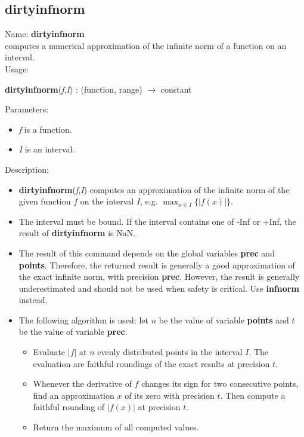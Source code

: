 \subsection{dirtyinfnorm}
\label{labdirtyinfnorm}
\noindent Name: \textbf{dirtyinfnorm}\\
computes a numerical approximation of the infinite norm of a function on an interval.\\

\noindent Usage: 
\begin{center}
\textbf{dirtyinfnorm}(\emph{f},\emph{I}) : (\textsf{function}, \textsf{range}) $\rightarrow$ \textsf{constant}\\
\end{center}
Parameters: 
\begin{itemize}
\item \emph{f} is a function.
\item \emph{I} is an interval.
\end{itemize}
\noindent Description: \begin{itemize}

\item \textbf{dirtyinfnorm}(\emph{f},\emph{I}) computes an approximation of the infinite norm of the 
   given function $f$ on the interval $I$, e.g. $\max_{x \in I} \{|f(x)|\}$.

\item The interval must be bound. If the interval contains one of -Inf or +Inf, the 
   result of \textbf{dirtyinfnorm} is NaN.

\item The result of this command depends on the global variables \textbf{prec} and \textbf{points}.
   Therefore, the returned result is generally a good approximation of the exact
   infinite norm, with precision \textbf{prec}. However, the result is generally 
   underestimated and should not be used when safety is critical.
   Use \textbf{infnorm} instead.

\item The following algorithm is used: let $n$ be the value of variable \textbf{points}
   and $t$ be the value of variable \textbf{prec}.
   \begin{itemize}
   \item  Evaluate $|f|$ at $n$ evenly distributed points in the
     interval $I$. The evaluation are faithful roundings of the exact
     results at precision $t$.
   \item  Whenever the derivative of $f$ changes its sign for two consecutive 
     points, find an approximation $x$ of its zero with precision $t$.
     Then compute a faithful rounding of $|f(x)|$ at precision $t$.
   \item  Return the maximum of all computed values.
   \end{itemize}
\end{itemize}
